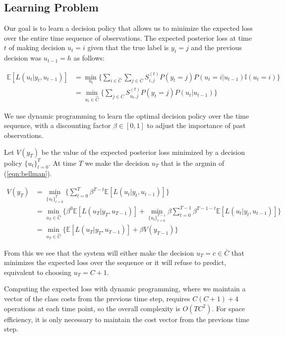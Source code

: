 \documentclass[12pt,solutions]{article}
\newcommand{\I}{\mathbb{I}}
\newcommand{\E}{\mathbb{E}}
\begin{document}
\subsection{Learning Problem}
Our goal is to learn a decision policy that allows us to minimize the expected loss over the entire time sequence of observations.
The expected posterior loss at time $t$ of making decision $u_t=i$ given that the true label is $y_t=j$ and the previous decision was $u_{t-1}=h$ as follows:

\begin{align}
\E[L(u_t|y_t, u_{t-1})] &= \min_{u_t} \Big\{ \sum_{i \in \hat{C}} \sum_{j \in \bar{C}} S_{i,j}^{(t)} P(y_t=j)P(u_t=i|u_{t-1})\I(u_t=i)\Big\}\\
&= \min_{u_t \in \hat{C}} \Big\{ \sum_{j \in \bar{C}} S_{u_t,j}^{(t)} P(y_t=j)P(u_t|u_{t-1})\Big\}
\label{eqn:exploss}
\end{align}

We use dynamic programming to learn the optimal decision policy over the time sequence, with a discounting factor $\beta \in [0,1]$ to adjust the importance of past observations.

Let $V(y_T)$ be the value of the expected posterior loss minimized by a decision policy $\{u_t\}_{t=0}^{T}$. At time $T$ we make the decision $u_T$ that is the argmin of (\ref{eqn:bellman}).

\begin{align}
V(y_T) &= \min_{\{u_t\}_{t=0}^{T}} \Big\{ \sum_{t=0}^T \beta^{T-t}\E[L(u_t|y_t, u_{t-1})] \Big\}\\
&= \min_{u_T \in \hat{C}} \Big\{  \beta^{0}\E[L(u_T|y_T, u_{T-1})] + \min_{\{u_t\}_{t=0}^{T-1}} \beta \sum_{t=0}^{T-1} \beta^{T-1-t}\E[L(u_t|y_t, u_{t-1})] \Big\}\\
&= \min_{u_T \in \hat{C}} \Big\{  \E[L(u_T|y_T, u_{T-1})] + \beta V(y_{T-1})\Big\} \label{eqn:bellman}
\end{align}

From this we see that the system will either make the decision $u_T = c \in \bar{C}$ that minimizes the expected loss over the sequence or it will refuse to predict, equivalent to choosing $u_T = C+1$. 

Computing the expected loss with dynamic programming, where we maintain a vector of the class costs from the previous time step, requires $C(C+1)+4$ operations at each time point, so the overall complexity is $O(TC^2)$. For space efficiency, it is only necessary to maintain the cost vector from the previous time step.




\end{document}
